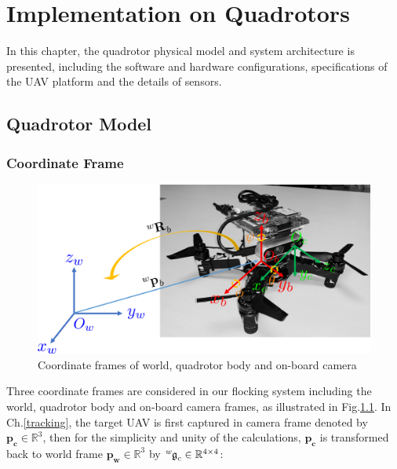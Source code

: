 \chapter{Implementation on Quadrotors}\label{implementation}

In this chapter, the quadrotor physical model and system architecture is presented, including the software and hardware configurations, specifications of the UAV platform and the details of sensors.

\section{Quadrotor Model}

\subsection{Coordinate Frame}

\begin{figure}[htb]
  \centering
  \includegraphics[width=1.0\textwidth]{figure/chapter_4/coordinate.png}
  \caption{Coordinate frames of world, quadrotor body and on-board camera}
  \label{fig:coordinate}
\end{figure}

Three coordinate frames are considered in our flocking system including the world, quadrotor body and on-board camera frames, as illustrated in Fig.\ref{fig:coordinate}. In Ch.\ref{tracking}, the target UAV is first captured in camera frame denoted by $\mathbf{p_c}\in\mathbb{R}^3$, then for the simplicity and unity of the calculations, $\mathbf{p_c}$ is transformed back to world frame $\mathbf{p_w}\in\mathbb{R}^3$ by $\tensor*[^w]{\mathfrak{g}}{_c}\in\mathbb{R}^{4\times4}$:

